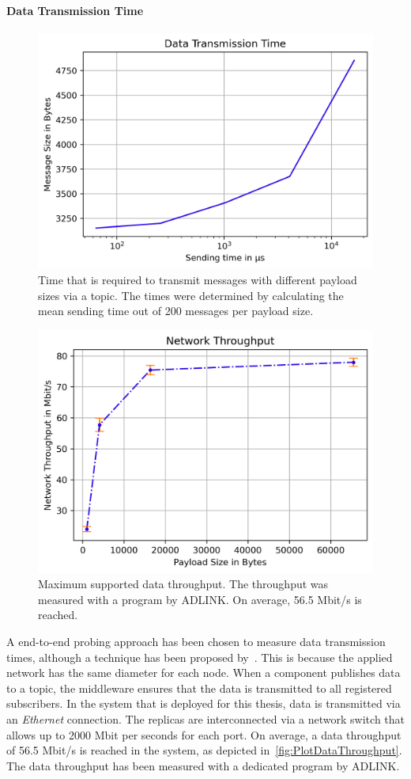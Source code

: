 \paragraph{Data Transmission Time}
\begin{figure}[!hb]
	\centering
	\includegraphics[width=0.75\linewidth]{images/plots/sendingTimes}
	\caption{Time that is required to transmit messages with different payload sizes via a  topic. The times were determined by calculating the mean sending time out of 200 messages per payload size.}
	\label{fig:PlotSendingTimes}
\end{figure}

\begin{figure}[!hb]
	\centering
	\includegraphics[width=0.75\linewidth]{images/plots/dataThroughput}
	\caption{Maximum supported data throughput. The throughput was measured with a program by ADLINK. On average, 56.5 Mbit/s is reached.}
	\label{fig:PlotDataThroughput}
\end{figure}

A end-to-end probing approach has been chosen to measure data transmission times, although a   technique has been proposed by~\cite{SinhaMeasureNetworkLatency}.
This is because the applied network has the same diameter for each node.
When a component publishes data to a  topic, the middleware ensures that the data is transmitted to all registered subscribers.
In the system that is deployed for this thesis, data is transmitted via an \textit{Ethernet} connection.
The replicas are interconnected via a network switch that allows up to 2000 Mbit per seconds for each port.
On average, a data throughput of 56.5 Mbit/s is reached in the system, as depicted in~\autoref{fig:PlotDataThroughput}.
The data throughput has been measured with a dedicated program by ADLINK.

